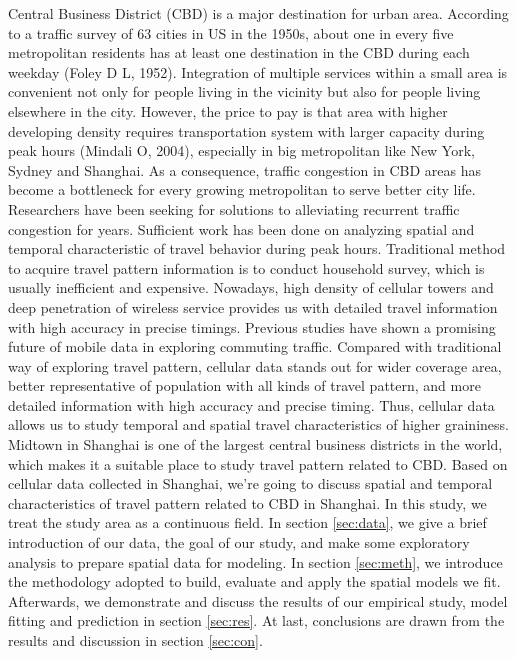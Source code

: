 \documentclass[hidelinks,12pt]{article}
\begin{document}
	Central Business District (CBD) is a major destination for urban area. According to a traffic survey of 63 cities in US in the 1950s, about one in every five metropolitan residents has at least one destination in the CBD during each weekday (Foley D L, 1952). Integration of multiple services within a small area is convenient not only for people living in the vicinity but also for people living elsewhere in the city. However, the price to pay is that area with higher developing density requires transportation system with larger capacity during peak hours (Mindali O, 2004), especially in big metropolitan like New York, Sydney and Shanghai. As a consequence, traffic congestion in CBD areas has become a bottleneck for every growing metropolitan to serve better city life.\\
	
	Researchers have been seeking for solutions to alleviating recurrent traffic congestion for years. Sufficient work has been done on analyzing spatial and temporal characteristic of travel behavior during peak hours. Traditional method to acquire travel pattern information is to conduct household survey, which is usually inefficient and expensive. Nowadays, high density of cellular towers and deep penetration of wireless service provides us with detailed travel information with high accuracy in precise timings. Previous studies have shown a promising future of mobile data in exploring commuting traffic. Compared with traditional way of exploring travel pattern, cellular data stands out for wider coverage area, better representative of population with all kinds of travel pattern, and more detailed information with high accuracy and precise timing. Thus, cellular data allows us to study temporal and spatial travel characteristics of higher graininess. \\
	
	Midtown in Shanghai is one of the largest central business districts in the world, which makes it a suitable place to study travel pattern related to CBD. Based on cellular data collected in Shanghai, we're going to discuss spatial and temporal characteristics of travel pattern related to CBD in Shanghai. In this study, we treat the study area as a continuous field. In section \ref{sec:data}, we give a brief introduction of our data, the goal of our study, and make some exploratory analysis to prepare spatial data for modeling. In section \ref{sec:meth}, we introduce the methodology adopted to build, evaluate and apply the spatial models we fit. Afterwards, we demonstrate and discuss the results of our empirical study, model fitting and prediction in section \ref{sec:res}. At last, conclusions are drawn from the results and discussion in section \ref{sec:con}. 	
	
\end{document}
